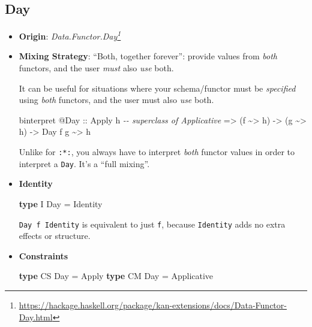 \documentclass[]{article}
\newenvironment{Shaded}{}{}
\newcommand{\CommentTok}[1]{\textcolor[rgb]{0.38,0.63,0.69}{\textit{#1}}}
\newcommand{\DataTypeTok}[1]{\textcolor[rgb]{0.56,0.13,0.00}{#1}}
\newcommand{\KeywordTok}[1]{\textcolor[rgb]{0.00,0.44,0.13}{\textbf{#1}}}
\newcommand{\NormalTok}[1]{#1}
\newcommand{\OperatorTok}[1]{\textcolor[rgb]{0.40,0.40,0.40}{#1}}
\newcommand{\OtherTok}[1]{\textcolor[rgb]{0.00,0.44,0.13}{#1}}
\renewcommand{\href}[2]{#2\footnote{\url{#1}}}
\begin{document}
\hypertarget{day}{%
\subsection{Day}\label{day}}

\begin{itemize}
\item
  \textbf{Origin}:
  \emph{\href{https://hackage.haskell.org/package/kan-extensions/docs/Data-Functor-Day.html}{Data.Functor.Day}}
\item
  \textbf{Mixing Strategy}: ``Both, together forever'': provide values from
  \emph{both} functors, and the user \emph{must} also \emph{use} both.

  It can be useful for situations where your schema/functor must be
  \emph{specified} using \emph{both} functors, and the user must also \emph{use}
  both.

\begin{Shaded}
\begin{Highlighting}[]
\NormalTok{binterpret }\OperatorTok{@}\DataTypeTok{Day}
\OtherTok{    ::} \DataTypeTok{Apply}\NormalTok{ h          }\CommentTok{{-}{-} superclass of Applicative}
    \OtherTok{=>}\NormalTok{ (f }\OperatorTok{\textasciitilde{}>}\NormalTok{ h)}
    \OtherTok{{-}>}\NormalTok{ (g }\OperatorTok{\textasciitilde{}>}\NormalTok{ h)}
    \OtherTok{{-}>} \DataTypeTok{Day}\NormalTok{ f g }\OperatorTok{\textasciitilde{}>}\NormalTok{ h}
\end{Highlighting}
\end{Shaded}

  Unlike for \texttt{:*:}, you always have to interpret \emph{both} functor
  values in order to interpret a \texttt{Day}. It's a ``full mixing''.
\item
  \textbf{Identity}

\begin{Shaded}
\begin{Highlighting}[]
\KeywordTok{type} \DataTypeTok{I} \DataTypeTok{Day} \OtherTok{=} \DataTypeTok{Identity}
\end{Highlighting}
\end{Shaded}

  \texttt{Day\ f\ Identity} is equivalent to just \texttt{f}, because
  \texttt{Identity} adds no extra effects or structure.
\item
  \textbf{Constraints}

\begin{Shaded}
\begin{Highlighting}[]
\KeywordTok{type} \DataTypeTok{CS} \DataTypeTok{Day} \OtherTok{=} \DataTypeTok{Apply}
\KeywordTok{type} \DataTypeTok{CM} \DataTypeTok{Day} \OtherTok{=} \DataTypeTok{Applicative}


\end{Highlighting}
\end{Shaded}
\end{itemize}
\end{document}
